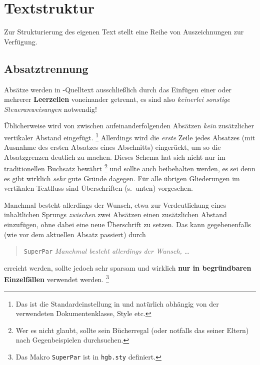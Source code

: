 \section{Textstruktur}

Zur Strukturierung des eigenen Text stellt \latex eine Reihe von Auszeichnungen zur Verfügung.

\subsection{Absatztrennung}

Absätze werden in {\latex}-Quelltext ausschließlich durch das
Einfügen einer oder mehrerer \textbf{Leerzeilen} voneinander
getrennt, es sind also \emph{keinerlei sonstige Steueranweisungen}
notwendig!
%
\begin{center}
\setlength{\fboxrule}{0.2mm}
\setlength{\fboxsep}{2mm}
\end{center}

Üblicherweise wird von {\latex} zwischen aufeinanderfolgenden 
Ab\-sätzen \emph{kein} zusätzlicher vertikaler Abstand eingefügt.%
\footnote{Das ist die Standardeinstellung in {\latex} und
natürlich abhängig von der verwendeten Dokumentenklasse, Style
etc.} 
Allerdings wird die
\emph{erste} Zeile jedes Absatzes (mit Ausnahme des ersten Absatzes
eines Abschnitts) eingerückt, um so die Absatzgrenzen deutlich zu
machen. Dieses Schema hat sich nicht nur im traditionellen
Buchsatz bewährt%
\footnote{Wer es nicht glaubt, sollte sein Bücherregal (oder notfalls das seiner Eltern) nach Gegenbeispielen durchsuchen.}
und sollte auch beibehalten werden, es sei denn
es gibt wirklich \emph{sehr} gute Gründe dagegen.
Für alle übrigen Gliederungen im vertikalen Textfluss sind Überschriften (s.\ unten) vorgesehen.

\SuperPar 
Manchmal besteht allerdings der Wunsch, etwa zur Verdeutlichung eines inhaltlichen Sprungs \emph{zwischen} zwei Absätzen einen zusätzlichen Abstand einzufügen, ohne dabei eine neue Überschrift zu setzen. Das kann gegebenenfalls (wie vor dem aktuellen Absatz passiert) durch 
%
\begin{quote}
\texttt{{\bs}SuperPar} \emph{Manchmal besteht allerdings der Wunsch, \ldots}
\end{quote}
%
erreicht werden, sollte jedoch sehr sparsam und wirklich \textbf{nur in begründbaren Einzelfällen} verwendet werden.%
\footnote{Das Makro \texttt{{\bs}SuperPar} ist in \texttt{hgb.sty} definiert.}




